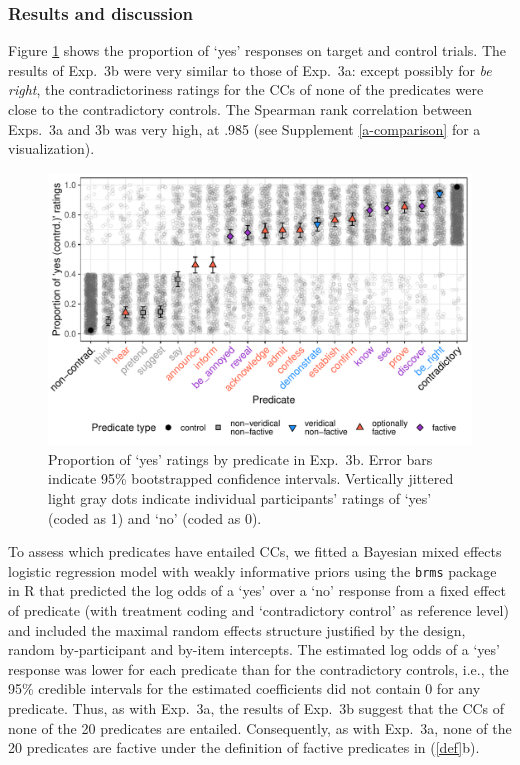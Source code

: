 \documentclass[11pt,fleqn]{article}
\newcommand{\6}{\mbox{$[\hspace*{-.6mm}[$}}
\newcommand{\9}{\mbox{$]\hspace*{-.6mm}]$}}
\begin{document}
{\subsubsection{Results and discussion}

Figure \ref{fig:3bresults} shows the proportion of `yes' responses on target and control trials. The results of Exp.~3b were very similar to those of Exp.~3a: except possibly for {\em be right}, the contradictoriness ratings for the CCs of none of the predicates were close to the contradictory controls. The Spearman rank correlation between Exps.~3a and 3b was very high, at .985 (see Supplement \ref{a-comparison} for a visualization).

\begin{figure}[h!]
\centering
\includegraphics[width=.7\paperwidth]{../../results/6-veridicality2-binary/graphs/proportion-by-predicate-variability-individual}
\caption{Proportion of `yes' ratings by predicate in Exp.~3b. Error bars indicate 95\% bootstrapped confidence intervals. Vertically jittered light gray dots indicate individual participants' ratings of `yes' (coded as 1) and `no' (coded as 0). }
\label{fig:3bresults}
\end{figure}

To assess which predicates have entailed CCs, we fitted a Bayesian mixed effects logistic regression model with weakly informative priors using the \verb|brms|  package in R that predicted the log odds of a `yes' over a `no' response from a fixed effect of predicate (with treatment coding and `contradictory control' as  reference level) and included the maximal random effects structure justified by the design, random by-participant and by-item intercepts. The estimated log odds of a `yes' response was lower for each predicate than for the contradictory controls, i.e., the 95\% credible intervals for the estimated coefficients did not contain 0 for any predicate. Thus, as with Exp.~3a, the results of Exp.~3b suggest that the CCs of none of the 20 predicates are entailed. Consequently, as with Exp.~3a, none of the 20 predicates are factive under the definition of factive predicates in (\ref{def}b). 

}
\end{document}
